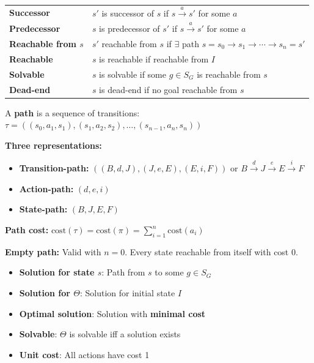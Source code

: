 \documentclass[11pt,a4paper]{article}
\begin{document}
\begin{definitionbox}
\begin{tabular}{@{}ll@{}}
\textbf{Successor} & $s'$ is successor of $s$ if $s \xrightarrow{a} s'$ for some $a$ \\
\textbf{Predecessor} & $s$ is predecessor of $s'$ if $s \xrightarrow{a} s'$ for some $a$ \\
\textbf{Reachable from $s$} & $s'$ reachable from $s$ if $\exists$ path $s = s_0 \to s_1 \to \cdots \to s_n = s'$ \\
\textbf{Reachable} & $s$ is reachable if reachable from $I$ \\
\textbf{Solvable} & $s$ is solvable if some $g \in S_G$ is reachable from $s$ \\
\textbf{Dead-end} & $s$ is dead-end if no goal reachable from $s$ \\
\end{tabular}
\end{definitionbox}

\begin{definitionbox}
A \textbf{path} is a sequence of transitions: $\tau = ((s_0, a_1, s_1), (s_1, a_2, s_2), \ldots, (s_{n-1}, a_n, s_n))$

\textbf{Three representations:}
\begin{itemize}[leftmargin=*,nosep]
\item \textbf{Transition-path:} $((B, d, J), (J, e, E), (E, i, F))$ or $B \xrightarrow{d} J \xrightarrow{e} E \xrightarrow{i} F$
\item \textbf{Action-path:} $(d, e, i)$
\item \textbf{State-path:} $(B, J, E, F)$
\end{itemize}

\textbf{Path cost:} $\text{cost}(\tau) = \text{cost}(\pi) = \sum_{i=1}^{n} \text{cost}(a_i)$

\textbf{Empty path:} Valid with $n=0$. Every state reachable from itself with cost 0.
\end{definitionbox}

\begin{definitionbox}[Solutions]
\begin{itemize}[leftmargin=*,nosep]
\item \textbf{Solution for state $s$}: Path from $s$ to some $g \in S_G$
\item \textbf{Solution for $\Theta$}: Solution for initial state $I$
\item \textbf{Optimal solution}: Solution with \textbf{minimal cost}
\item \textbf{Solvable}: $\Theta$ is solvable iff a solution exists
\item \textbf{Unit cost}: All actions have cost 1
\end{itemize}
\end{definitionbox}
\end{document}
